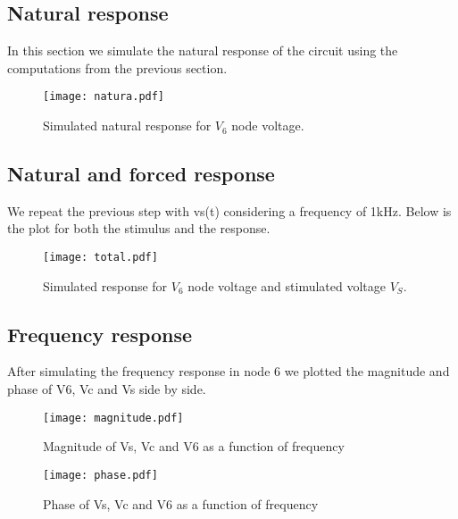 \subsection{Natural response}
In this section we simulate the natural response of the circuit using the computations from the previous section.
\begin{figure}[!h] \centering
\texttt{[image: natura.pdf]}
\caption{Simulated natural response for $V_{6}$ node voltage.}
\label{fig:natura}
\end{figure}
\newpage
\subsection{Natural and forced response}
We repeat the previous step with vs(t) considering a frequency of 1kHz. Below is the plot for both the stimulus and the response.
\begin{figure}[!h] \centering
\texttt{[image: total.pdf]}
\caption{Simulated response for $V_{6}$ node voltage and stimulated voltage $V_{S}$.}
\label{fig:total}
\end{figure}
\newpage
\subsection{Frequency response}
After simulating the frequency response in node 6 we plotted the magnitude and phase of V6, Vc and Vs side by side.
\begin{figure}[!h] \centering
\texttt{[image: magnitude.pdf]}
\caption{Magnitude of Vs, Vc and V6 as a function of frequency}
\label{fig:magnitude}
\end{figure}
\begin{figure}[h] \centering
\texttt{[image: phase.pdf]}
\caption{Phase of Vs, Vc and V6 as a function of frequency}
\label{fig:phase}
\end{figure}
\par
